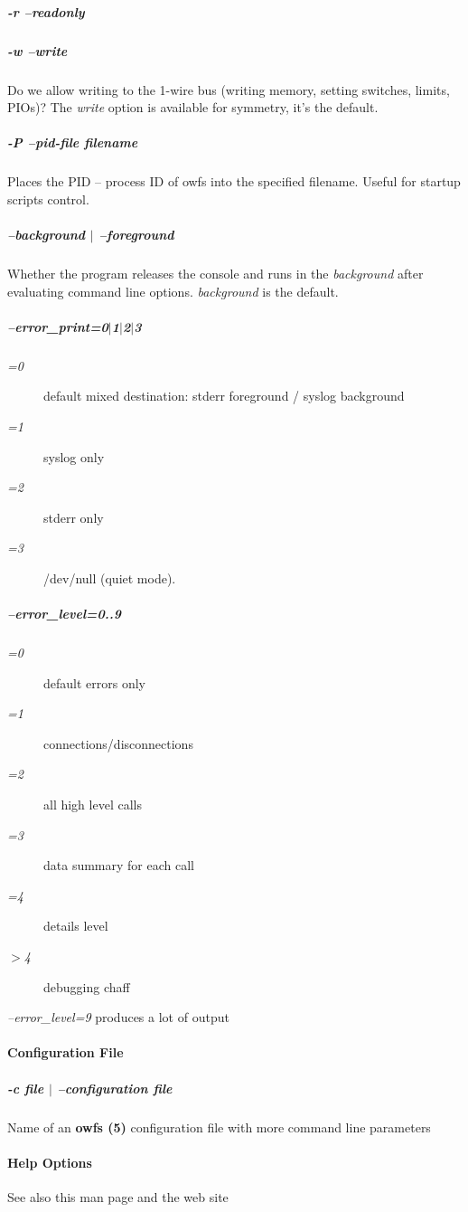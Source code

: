 \subparagraph*{-r --readonly}
\subparagraph*{-w --write}Do we allow writing to the 1-wire bus (writing memory,
setting switches, limits, PIOs)? The \textit{write} option is available for symmetry,
it's the default. 
\subparagraph*{-P --pid-file \dq{}filename\dq{}}Places the PID -- process ID of owfs
into the specified filename. Useful for startup scripts control. 
\subparagraph*{--background
$|$ --foreground}Whether the program releases the console and runs in the \textit{background}
after evaluating command line options. \textit{background} is the default. 
\subparagraph*{--error\_print=0$|$1$|$2$|$3}\begin{description}
\item [\textit{=0}
] default mixed destination: stderr foreground / syslog background 
\item [\textit{=1} ] syslog
only 
\item [\textit{=2} ] stderr only 
\item [\textit{=3} ] /dev/null (quiet mode). 
\end{description}

\subparagraph*{--error\_level=0..9}\begin{description}
\item [\textit{=0} ] default
errors only 
\item [\textit{=1} ] connections/disconnections 
\item [\textit{=2} ] all high level calls 
\item [\textit{=3} ] data
summary for each call 
\item [\textit{=4} ] details level 
\item [\textit{$>$4} ] debugging chaff 
\end{description}


\textit{--error\_level=9}
produces a lot of output            
\paragraph*{Configuration File}

\subparagraph*{-c file $|$ --configuration
file}Name of an \textsf{\textbf{owfs (5)}} configuration file with more command line parameters
            
\paragraph*{Help Options}
See also this man page and the web site 

